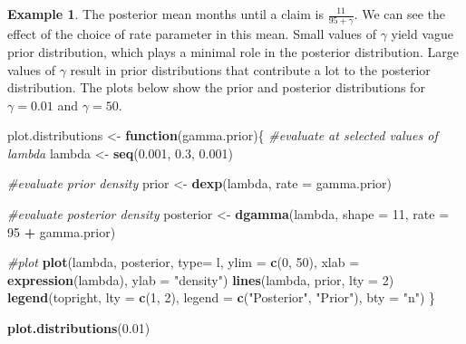 \documentclass[
]{book}
\newenvironment{Shaded}{\begin{snugshade}}{\end{snugshade}}
\newcommand{\AttributeTok}[1]{\textcolor[rgb]{0.13,0.29,0.53}{#1}}
\newcommand{\CommentTok}[1]{\textcolor[rgb]{0.56,0.35,0.01}{\textit{#1}}}
\newcommand{\ControlFlowTok}[1]{\textcolor[rgb]{0.13,0.29,0.53}{\textbf{#1}}}
\newcommand{\DecValTok}[1]{\textcolor[rgb]{0.00,0.00,0.81}{#1}}
\newcommand{\FloatTok}[1]{\textcolor[rgb]{0.00,0.00,0.81}{#1}}
\newcommand{\FunctionTok}[1]{\textcolor[rgb]{0.13,0.29,0.53}{\textbf{#1}}}
\newcommand{\NormalTok}[1]{#1}
\newcommand{\OtherTok}[1]{\textcolor[rgb]{0.56,0.35,0.01}{#1}}
\newcommand{\SpecialCharTok}[1]{\textcolor[rgb]{0.81,0.36,0.00}{\textbf{#1}}}
\newcommand{\StringTok}[1]{\textcolor[rgb]{0.31,0.60,0.02}{#1}}
\theoremstyle{definition}
\theoremstyle{definition}
\newtheorem{example}{Example}[chapter]
\theoremstyle{definition}
\theoremstyle{definition}
\theoremstyle{remark}
\begin{document}
\begin{example}
The posterior mean months until a claim is \(\frac{11}{95 + \gamma}\). We can see the effect of the choice of rate parameter in this mean. Small values of \(\gamma\) yield vague prior distribution, which plays a minimal role in the posterior distribution. Large values of \(\gamma\) result in prior distributions that contribute a lot to the posterior distribution. The plots below show the prior and posterior distributions for \(\gamma = 0.01\) and \(\gamma = 50\).

\begin{Shaded}
\begin{Highlighting}[]
\NormalTok{plot.distributions }\OtherTok{\textless{}{-}} \ControlFlowTok{function}\NormalTok{(gamma.prior)\{}
  \CommentTok{\#evaluate at selected values of lambda}
\NormalTok{  lambda }\OtherTok{\textless{}{-}} \FunctionTok{seq}\NormalTok{(}\FloatTok{0.001}\NormalTok{, }\FloatTok{0.3}\NormalTok{, }\FloatTok{0.001}\NormalTok{) }
  
  \CommentTok{\#evaluate prior density}
\NormalTok{  prior }\OtherTok{\textless{}{-}} \FunctionTok{dexp}\NormalTok{(lambda, }\AttributeTok{rate =}\NormalTok{ gamma.prior)}
  
  \CommentTok{\#evaluate posterior density}
\NormalTok{  posterior }\OtherTok{\textless{}{-}} \FunctionTok{dgamma}\NormalTok{(lambda, }\AttributeTok{shape =} \DecValTok{11}\NormalTok{, }\AttributeTok{rate =} \DecValTok{95} \SpecialCharTok{+}\NormalTok{ gamma.prior)}
  
  
  \CommentTok{\#plot}
  \FunctionTok{plot}\NormalTok{(lambda, posterior, }\AttributeTok{type=} \StringTok{\textquotesingle{}l\textquotesingle{}}\NormalTok{, }
       \AttributeTok{ylim =} \FunctionTok{c}\NormalTok{(}\DecValTok{0}\NormalTok{, }\DecValTok{50}\NormalTok{), }\AttributeTok{xlab =} \FunctionTok{expression}\NormalTok{(lambda), }\AttributeTok{ylab =} \StringTok{"density"}\NormalTok{)}
  \FunctionTok{lines}\NormalTok{(lambda, prior, }\AttributeTok{lty =} \DecValTok{2}\NormalTok{)}
  \FunctionTok{legend}\NormalTok{(}\StringTok{\textquotesingle{}topright\textquotesingle{}}\NormalTok{, }\AttributeTok{lty =} \FunctionTok{c}\NormalTok{(}\DecValTok{1}\NormalTok{, }\DecValTok{2}\NormalTok{), }\AttributeTok{legend =} \FunctionTok{c}\NormalTok{(}\StringTok{"Posterior"}\NormalTok{, }\StringTok{"Prior"}\NormalTok{),  }
         \AttributeTok{bty =} \StringTok{"n"}\NormalTok{)}
\NormalTok{\}}

\FunctionTok{plot.distributions}\NormalTok{(}\FloatTok{0.01}\NormalTok{)}
\end{Highlighting}
\end{Shaded}


\end{example}
\end{document}
